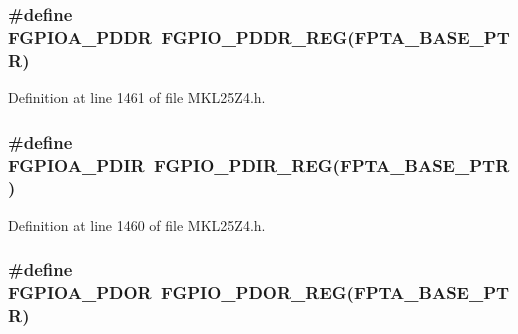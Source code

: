 \subsubsection[{\texorpdfstring{F\+G\+P\+I\+O\+A\+\_\+\+P\+D\+DR}{FGPIOA_PDDR}}]{\setlength{\rightskip}{0pt plus 5cm}\#define F\+G\+P\+I\+O\+A\+\_\+\+P\+D\+DR~{\bf F\+G\+P\+I\+O\+\_\+\+P\+D\+D\+R\+\_\+\+R\+EG}({\bf F\+P\+T\+A\+\_\+\+B\+A\+S\+E\+\_\+\+P\+TR})}\hypertarget{group___f_g_p_i_o___register___accessor___macros_ga204fe15ec7de05c776e5cb9495cbdd3d}{}\label{group___f_g_p_i_o___register___accessor___macros_ga204fe15ec7de05c776e5cb9495cbdd3d}


Definition at line 1461 of file M\+K\+L25\+Z4.\+h.

\subsubsection[{\texorpdfstring{F\+G\+P\+I\+O\+A\+\_\+\+P\+D\+IR}{FGPIOA_PDIR}}]{\setlength{\rightskip}{0pt plus 5cm}\#define F\+G\+P\+I\+O\+A\+\_\+\+P\+D\+IR~{\bf F\+G\+P\+I\+O\+\_\+\+P\+D\+I\+R\+\_\+\+R\+EG}({\bf F\+P\+T\+A\+\_\+\+B\+A\+S\+E\+\_\+\+P\+TR})}\hypertarget{group___f_g_p_i_o___register___accessor___macros_ga57ce2593aaa22d95d913601147592755}{}\label{group___f_g_p_i_o___register___accessor___macros_ga57ce2593aaa22d95d913601147592755}


Definition at line 1460 of file M\+K\+L25\+Z4.\+h.

\subsubsection[{\texorpdfstring{F\+G\+P\+I\+O\+A\+\_\+\+P\+D\+OR}{FGPIOA_PDOR}}]{\setlength{\rightskip}{0pt plus 5cm}\#define F\+G\+P\+I\+O\+A\+\_\+\+P\+D\+OR~{\bf F\+G\+P\+I\+O\+\_\+\+P\+D\+O\+R\+\_\+\+R\+EG}({\bf F\+P\+T\+A\+\_\+\+B\+A\+S\+E\+\_\+\+P\+TR})}\hypertarget{group___f_g_p_i_o___register___accessor___macros_gae9758c811074785f7b017f89828ffa84}{}\label{group___f_g_p_i_o___register___accessor___macros_gae9758c811074785f7b017f89828ffa84}


